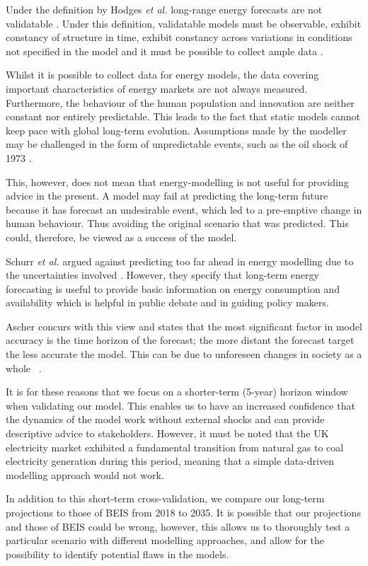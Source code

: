 Under the definition by Hodges \textit{et al.} \cite{Hodges} long-range energy forecasts are not validatable \cite{Craig2002}. Under this definition, validatable models must be observable, exhibit constancy of structure in time, exhibit constancy across variations in conditions not specified in the model and it must be possible to collect ample data \cite{Hodges}.


Whilst it is possible to collect data for energy models, the data covering important characteristics of energy markets are not always measured. Furthermore, the behaviour of the human population and innovation are neither constant nor entirely predictable. This leads to the fact that static models cannot keep pace with global long-term evolution. Assumptions made by the modeller may be challenged in the form of unpredictable events, such as the oil shock of 1973 \cite{Craig2002}.

This, however, does not mean that energy-modelling is not useful for providing advice in the present. A model may fail at predicting the long-term future because it has forecast an undesirable event, which led to a pre-emptive change in human behaviour. Thus avoiding the original scenario that was predicted. This could, therefore, be viewed as a success of the model.

Schurr \textit{et al.} argued against predicting too far ahead in energy modelling due to the uncertainties involved \cite{Schurr_1961}. However, they specify that long-term energy forecasting is useful to provide basic information on energy consumption and availability which is helpful in public debate and in guiding policy makers.


Ascher concurs with this view and states that the most significant factor in model accuracy is the time horizon of the forecast; the more distant the forecast target the less accurate the model. This can be due to unforeseen changes in society as a whole ~\cite{gillespie_1979}.

It is for these reasons that we focus on a shorter-term (5-year) horizon window when validating our model. This enables us to have an increased confidence that the dynamics of the model work without external shocks and can provide descriptive advice to stakeholders. However, it must be noted that the UK electricity market exhibited a fundamental transition from natural gas to coal electricity generation during this period, meaning that a simple data-driven modelling approach would not work.

In addition to this short-term cross-validation, we compare our long-term projections to those of BEIS from 2018 to 2035. It is possible that our projections and those of BEIS could be wrong, however, this allows us to thoroughly test a particular scenario with different modelling approaches, and allow for the possibility to identify potential flaws in the models.


